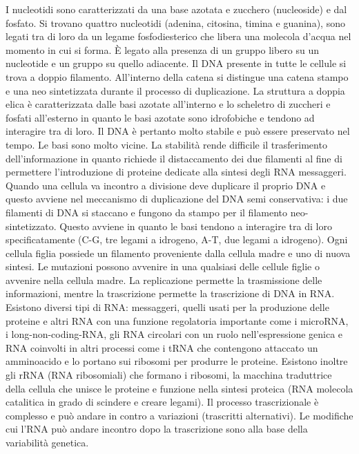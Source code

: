 I nucleotidi sono caratterizzati da una base azotata e 
zucchero (nucleoside) e dal fosfato. Si trovano quattro nucleotidi (adenina, citosina, timina e guanina), sono legati tra di loro da un legame fosfodiesterico che libera una molecola
d'acqua nel momento in cui si forma. \`E legato alla presenza di un gruppo  libero su un nucleotide e un gruppo  su quello adiacente. Il DNA presente in tutte le cellule si
trova a doppio filamento. All'interno della catena si distingue una catena stampo e una neo sintetizzata durante il processo di duplicazione. La struttura a doppia elica \`e 
caratterizzata dalle basi azotate all'interno e lo scheletro di zuccheri e fosfati all'esterno in quanto le basi azotate sono idrofobiche e tendono ad interagire tra di loro. Il DNA 
\`e pertanto molto stabile e pu\`o essere preservato nel tempo. Le basi sono molto vicine. La stabilit\`a rende difficile il trasferimento dell'informazione in quanto richiede 
il distaccamento dei due filamenti al fine di permettere l'introduzione di proteine dedicate alla sintesi degli RNA messaggeri. Quando una cellula va incontro a divisione deve duplicare
il proprio DNA e questo avviene nel meccanismo di duplicazione del DNA semi conservativa: i due filamenti di DNA si staccano e fungono da stampo per il filamento neo-sintetizzato. Questo
avviene in quanto le basi tendono a interagire tra di loro specificatamente (C-G, tre legami a idrogeno, A-T, due legami a idrogeno). Ogni cellula figlia possiede un filamento 
proveniente dalla cellula madre e uno di nuova sintesi. Le mutazioni possono avvenire in una qualsiasi delle cellule figlie o avvenire nella cellula madre. La replicazione permette la
trasmissione delle informazioni, mentre la trascrizione permette la trascrizione di DNA in RNA. Esistono diversi tipi di RNA: messaggeri, quelli usati per la produzione delle proteine e
altri RNA con una funzione regolatoria importante come i microRNA, i long-non-coding-RNA, gli RNA circolari con un ruolo nell'espressione genica e RNA coinvolti in altri processi come i 
tRNA che contengono attaccato un amminoacido e lo portano sui ribosomi per produrre le proteine. Esistono inoltre gli rRNA (RNA ribosomiali) che formano i ribosomi, la macchina 
traduttrice della cellula che unisce le proteine e funzione nella sintesi proteica (RNA molecola catalitica in grado di scindere e creare legami). Il processo trascrizionale \`e 
complesso e pu\`o andare in contro a variazioni (trascritti alternativi). Le modifiche cui l'RNA pu\`o andare incontro dopo la trascrizione sono alla base della variabilit\`a genetica. 
